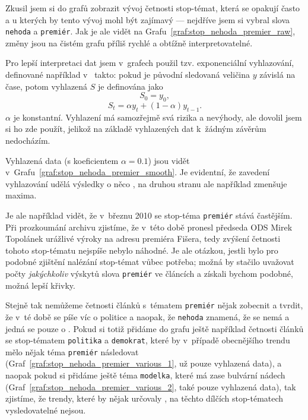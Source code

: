 \documentclass[12pt,a4paper]{report}
\begin{document}


Zkusil jsem si do grafů zobrazit vývoj četnosti stop-témat, která se opakují často a u kterých by tento vývoj mohl být zajímavý --- nejdříve jsem si vybral slova \texttt{nehoda} a \texttt{premiér}. Jak je ale vidět na Grafu~\ref{graf:stop_nehoda_premier_raw}, změny jsou na čistém grafu příliš rychlé a obtížně interpretovatelné.



Pro lepší interpretaci dat jsem v~grafech použil tzv. exponenciální vyhlazování, definované například v~\cite{nist} takto: pokud je původní sledovaná veličina $y$ závislá na čase, potom vyhlazená $S$ je definována jako $$S_0=y_0,$$ $$S_t=\alpha y_t+(1-\alpha)y_{t-1}.$$ $\alpha$ je konstantní. Vyhlazení má samozřejmě svá rizika a nevýhody, ale dovolil jsem si ho zde použít, jelikož na základě vyhlazených dat k~žádným  závěrům nedocházím.


Vyhlazená data (s koeficientem $\alpha=0.1$) jsou vidět v~Grafu~\ref{graf:stop_nehoda_premier_smooth}. Je evidentní, že zavedení vyhlazování udělá výsledky o něco , na druhou stranu ale například zmenšuje maxima.

Je ale například vidět, že v~březnu 2010 se stop-téma \texttt{premiér} stává častějším. Při prozkoumání archivu zjistíme, že v~této době pronesl předseda ODS Mirek Topolánek urážlivé výroky na adresu premiéra Fišera, tedy zvýšení četnosti tohoto stop-tématu nejspíše nebylo náhodné. Je ale otázkou, jestli bylo pro podobné zjištění nalézání stop-témat vůbec potřeba; možná by stačilo uvažovat počty \emph{jakýchkoliv} výskytů slova \texttt{premiér} ve článcích a získali bychom podobné, možná lepší křivky.



Stejně tak nemůžeme četnosti článků s~tématem \texttt{premiér} nějak zobecnit a tvrdit, že v~té době se píše víc o politice a naopak, že \texttt{nehoda} znamená, že se nemá  a jedná se pouze o . Pokud si totiž přidáme do grafu ještě například četnosti článků se stop-tématem \texttt{politika} a \texttt{demokrat}, které by v~případě obecnějšího trendu mělo nějak téma \texttt{premiér} následovat (Graf~\ref{graf:stop_nehoda_premier_various_1}, už pouze vyhlazená data), a naopak pokud si přidáme ještě téma \texttt{modelka}, které má zase bulvární nádech (Graf~\ref{graf:stop_nehoda_premier_various_2}, také pouze vyhlazená data), tak zjistíme, že trendy, které by nějak určovaly , na těchto dílčích stop-tématech vysledovatelné nejsou. 
\end{document}
